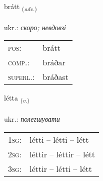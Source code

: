 \documentclass[frontgrid, backgrid]{flacards}\usepackage[]{graphicx}\usepackage[]{xcolor}
\begin{document}
\renewcommand{\flhead}{\vskip5pt \fboxsep=0pt {\small\bfseries\footnotesize Atviksorð | прислівник}}
\renewcommand{\fcfoot}{\vskip5pt \fboxsep=0pt \hspace{2pt}{\small\bfseries\footnotesize 3K}}

\renewcommand{\blhead}{\vskip5pt {\small\bfseries\footnotesize Atviksorð | прислівник }}
\renewcommand{\bcfoot}{\vskip5pt \hspace{2pt}{\small\bfseries\footnotesize 3K}}


{brátt \small{\textsubscript{(\textit{adv.})}} \\[1ex] %
\textphonetic{[prauht]} \\
ukr.: \emph{скоро; невдовзі} \\  [2ex]
\renewcommand*{\arraystretch}{0.8}
\begin{tabular}{ll}
\textsc{pos}: & brátt \\ 
\textsc{comp.}: & bráðar \\ 
\textsc{superl.}: & bráðast \\
\end{tabular}
}

\renewcommand{\flhead}{\vskip5pt \fboxsep=0pt {\small\bfseries\footnotesize Sagnorð | дієслово}}
\renewcommand{\fcfoot}{\vskip5pt \fboxsep=0pt \hspace{2pt}{\small\bfseries\footnotesize 3K}}

\renewcommand{\blhead}{\vskip5pt {\small\bfseries\footnotesize Sagnorð | дієслово }}
\renewcommand{\bcfoot}{\vskip5pt \hspace{2pt}{\small\bfseries\footnotesize 3K}}


{létta \small{\textsubscript{(\textit{v.})}} \\[1ex] %
\textphonetic{[ljɛhta]} \\
ukr.: \emph{полегшувати} \\  [2ex]
\renewcommand*{\arraystretch}{0.8}
\begin{tabular}{p{1cm}l}
\textsc{1sg}: & létti -- létti -- létt \\ 
\textsc{2sg}: & léttir -- léttir -- létt \\ 
\textsc{3sg}: & léttir -- létti -- létt \\ 
\end{tabular}
}
\end{document}
